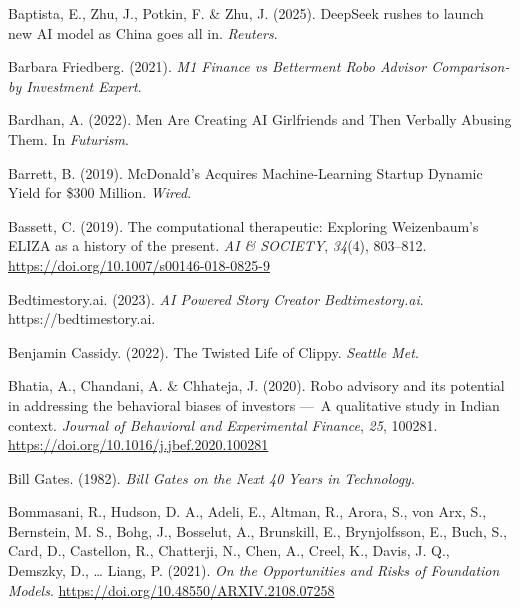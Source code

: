 \documentclass[
  letterpaper,
  DIV=11,
  numbers=noendperiod]{scrartcl}
\newlength{\cslhangindent}
\newenvironment{CSLReferences}[2] %
 {\begin{list}{}{%
  \setlength{\itemindent}{0pt}
  \setlength{\leftmargin}{0pt}
  \setlength{\parsep}{0pt}
  \ifodd #1
   \setlength{\leftmargin}{\cslhangindent}
   \setlength{\itemindent}{-1\cslhangindent}
  \fi
  \setlength{\itemsep}{#2\baselineskip}}}
 {\end{list}}
\begin{document}
\begin{CSLReferences}{1}{0}
Baptista, E., Zhu, J., Potkin, F. \& Zhu, J. (2025). {DeepSeek} rushes
to launch new {AI} model as {China} goes all in. \emph{Reuters}.

Barbara Friedberg. (2021). \emph{M1 {Finance} vs {Betterment Robo
Advisor Comparison-by Investment Expert}}.

Bardhan, A. (2022). Men {Are Creating AI Girlfriends} and {Then Verbally
Abusing Them}. In \emph{Futurism}.

Barrett, B. (2019). {McDonald}'s {Acquires Machine-Learning Startup
Dynamic Yield} for \$300 {Million}. \emph{Wired}.

Bassett, C. (2019). The computational therapeutic: Exploring
{Weizenbaum}'s {ELIZA} as a history of the present. \emph{AI \&
SOCIETY}, \emph{34}(4), 803--812.
\url{https://doi.org/10.1007/s00146-018-0825-9}

Bedtimestory.ai. (2023). \emph{{AI Powered Story Creator} {\textbar}
{Bedtimestory}.ai}. https://bedtimestory.ai.

Benjamin Cassidy. (2022). The {Twisted Life} of {Clippy}. \emph{Seattle
Met}.

Bhatia, A., Chandani, A. \& Chhateja, J. (2020). Robo advisory and its
potential in addressing the behavioral biases of investors ---~{A}
qualitative study in {Indian} context. \emph{Journal of Behavioral and
Experimental Finance}, \emph{25}, 100281.
\url{https://doi.org/10.1016/j.jbef.2020.100281}

Bill Gates. (1982). \emph{Bill {Gates} on the {Next} 40 {Years} in
{Technology}}.

Bommasani, R., Hudson, D. A., Adeli, E., Altman, R., Arora, S., von Arx,
S., Bernstein, M. S., Bohg, J., Bosselut, A., Brunskill, E.,
Brynjolfsson, E., Buch, S., Card, D., Castellon, R., Chatterji, N.,
Chen, A., Creel, K., Davis, J. Q., Demszky, D., \ldots{} Liang, P.
(2021). \emph{On the {Opportunities} and {Risks} of {Foundation
Models}}. \url{https://doi.org/10.48550/ARXIV.2108.07258}


\end{CSLReferences}
\end{document}
